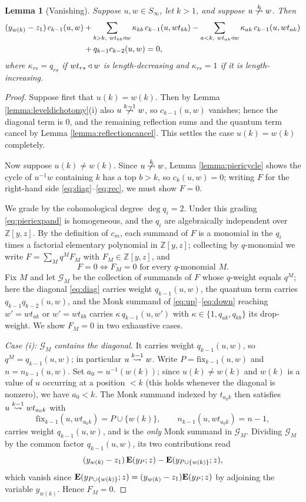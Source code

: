 \documentclass{amsart}
\newtheorem{lemma}{Lemma}[section]
\theoremstyle{definition}
\theoremstyle{remark}
\numberwithin{equation}{section}
\newcommand{\xrightsquigarrow}[2][]{%
	\mathrel{\mathop{\rightsquigarrow}\limits^{\scriptstyle #2}%
	\ifx\hfuzz#1\hfuzz\else_{\scriptstyle #1}\fi}%
}
\newcommand{\tom}[1]{\ensuremath{\xrightsquigarrow{#1}}}
\newcommand{\fx}{\mathrm{fix}}
\begin{document}
\begin{lemma}[Vanishing] \label{lemma:vanishing}
Suppose $u,w\in S_\infty$, let $k>1$, and suppose $u\ntom{k}w$. Then
\begin{align*}
(y_{w(k)}-z_1)\,c_{k-1}(u,w)
&+\sum_{\substack{b>k,\ wt_{kb}\triangleleft w}}\kappa_{kb}\,c_{k-1}(u,wt_{kb})
-\sum_{\substack{a<k,\ wt_{ak}\triangleleft w}}\kappa_{ak}\,c_{k-1}(u,wt_{ak})\\
&+q_{k-1}c_{k-2}(u,w)=0,
\end{align*}
where $\kappa_{rs}=q_{rs}$ if $wt_{rs}\triangleleft w$ is length-decreasing and $\kappa_{rs}=1$ if it is length-increasing.
\end{lemma}
\begin{proof}
Suppose first that $u(k)=w(k)$. Then by Lemma \ref{lemma:leveldichotomy}(i) also $u\ntom{k-1}w$, so $c_{k-1}(u,w)$ vanishes; hence the diagonal term is $0$, and the remaining reflection sums and the quantum term cancel by Lemma \ref{lemma:reflectioncancel}. This settles the case $u(k)=w(k)$ completely.

Now suppose $u(k)\neq w(k)$. Since $u\ntom{k}w$, Lemma \ref{lemma:piericycle} shows the cycle of $u^{-1}w$ containing $k$ has a top $b>k$, so $c_k(u,w)=0$; writing $F$ for the right-hand side \eqref{eq:diag}--\eqref{eq:rec}, we must show $F=0$.

We grade by the cohomological degree $\deg q_i=2$. Under this grading \eqref{eq:pieriexpand} is homogeneous, and the $q_i$ are algebraically independent over $\mathbb{Z}[y,z]$. By the definition of $c_m$, each summand of $F$ is a monomial in the $q_i$ times a factorial elementary polynomial in $\mathbb{Z}[y,z]$; collecting by $q$-monomial we write $F=\sum_M q^M F_M$ with $F_M\in\mathbb{Z}[y,z]$, and
\[
F=0 \iff F_M=0 \text{ for every } q\text{-monomial } M .
\]
Fix $M$ and let $\mathcal{G}_M$ be the collection of summands of $F$ whose $q$-weight equals $q^M$; here the diagonal \eqref{eq:diag} carries weight $q_{k-1}(u,w)$, the quantum term carries $q_{k-1}q_{k-2}(u,w)$, and the Monk summand of \eqref{eq:up}--\eqref{eq:down} reaching $w'=wt_{ak}$ or $w'=wt_{kb}$ carries $\kappa\,q_{k-1}(u,w')$ with $\kappa\in\{1,q_{a k},q_{k b}\}$ its drop-weight. We show $F_M=0$ in two exhaustive cases.

\emph{Case (i): $\mathcal{G}_M$ contains the diagonal.} It carries weight $q_{k-1}(u,w)$, so $q^M=q_{k-1}(u,w)$; in particular $u\tom{k-1}w$. Write $P=\fx_{{k-1}}(u,w)$ and $n=n_{k-1}(u,w)$. Set $a_0=u^{-1}(w(k))$; since $u(k)\neq w(k)$ and $w(k)$ is a value of $u$ occurring at a position $<k$ (this holds whenever the diagonal is nonzero), we have $a_0<k$. The Monk summand indexed by $t_{a_0 k}$ then satisfies $u\tom{k-1}wt_{a_0 k}$ with
$$\fx_{{k-1}}(u,wt_{a_0k})=P\cup\{w(k)\},\qquad n_{k-1}(u,wt_{a_0k})=n-1,$$
carries weight $q_{k-1}(u,w)$, and is the \emph{only} Monk summand in $\mathcal{G}_M$. Dividing $\mathcal{G}_M$ by the common factor $q_{k-1}(u,w)$, its two contributions read
$$(y_{w(k)}-z_1)\,\mathbf{E}(y_P;z)-\mathbf{E}(y_{P\cup\{w(k)\}};z),$$
which vanish since $\mathbf{E}(y_{P\cup\{w(k)\}};z)=(y_{w(k)}-z_1)\mathbf{E}(y_P;z)$ by adjoining the variable $y_{w(k)}$. Hence $F_M=0$.


\end{proof}
\end{document}
